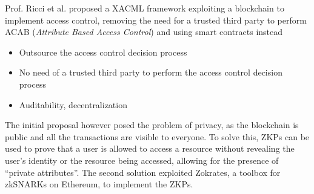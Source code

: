 Prof. Ricci et al. proposed a XACML framework exploiting a blockchain to implement access control, removing the need for a trusted third party to perform ACAB (\textit{Attribute Based Access Control}) and using smart contracts instead 
\begin{itemize}
   \item Outsource the access control decision process
   \item No need of a trusted third party to perform the access control decision
   process
   \item Auditability, decentralization
\end{itemize}

The initial proposal however posed the problem of privacy, as the blockchain is public and all the transactions are visible to everyone. To solve this, ZKPs can be used to prove that a user is allowed to access a resource without revealing the user's identity or the resource being accessed, allowing for the presence of ``private attributes''.
The second solution exploited Zokrates, a toolbox for zkSNARKs on Ethereum, to implement the ZKPs.